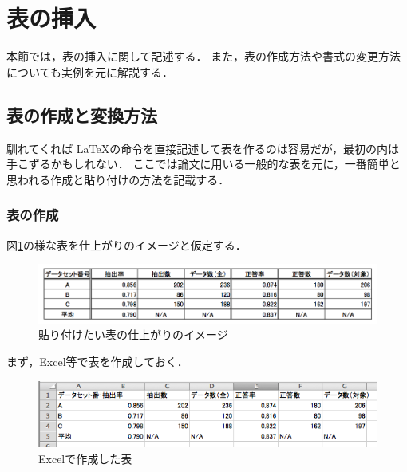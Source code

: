 \section{表の挿入}
本節では，表の挿入に関して記述する．
また，表の作成方法や書式の変更方法についても実例を元に解説する．

\subsection{表の作成と変換方法}
馴れてくれば \LaTeX の命令を直接記述して表を作るのは容易だが，最初の内は手こずるかもしれない．
ここでは論文に用いる一般的な表を元に，一番簡単と思われる作成と貼り付けの方法を記載する．

\subsubsection{表の作成}
図\ref{fig:tableFinish}の様な表を仕上がりのイメージと仮定する．
\begin{figure}[H]
\begin{center}
\includegraphics[width=14cm]{tableFinishImage.png}
\vspace{-3mm}
\end{center}
\caption{貼り付けたい表の仕上がりのイメージ}
\label{fig:tableFinish}
\end{figure}
まず，Excel等で表を作成しておく．
\begin{figure}[H]
\begin{center}
\includegraphics[width=14cm]{excelTable.png}
\vspace{-3mm}
\end{center}
\caption{Excelで作成した表}
\label{fig:excelTable}
\end{figure}

